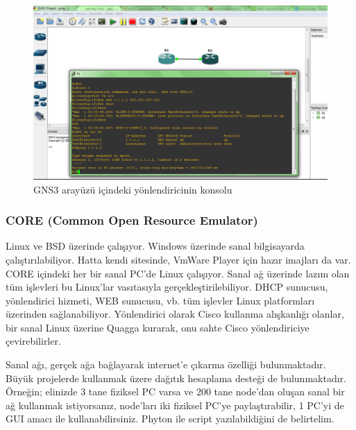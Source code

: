 \begin{figure}[H]
    \centering
    \includegraphics[width=\textwidth]{images/SimulatorGNS3.png}
    \caption{GNS3 arayüzü içindeki yönlendiricinin konsolu}
    \label{fig:GNS3}
\end{figure}

\subsubsection{CORE (Common Open Resource Emulator) }
Linux ve BSD üzerinde çalışıyor. Windows üzerinde sanal bilgisayarda çalıştırılabiliyor. Hatta kendi sitesinde, VmWare Player için hazır imajları da var. CORE içindeki her bir sanal PC'de Linux çalışıyor. Sanal ağ üzerinde lazım olan tüm işlevleri bu Linux'lar vasıtasıyla gerçekleştirilebiliyor. DHCP sunucusu, yönlendirici hizmeti, WEB sunucusu, vb. tüm işlevler Linux platformları üzerinden sağlanabiliyor. Yönlendirici olarak Cisco kullanma alışkanlığı olanlar, bir sanal Linux üzerine Quagga kurarak, onu sahte Cisco yönlendiriciye çevirebilirler.

Sanal ağı, gerçek ağa bağlayarak internet'e çıkarma özelliği bulunmaktadır. Büyük projelerde kullanmak üzere dağıtık hesaplama desteği de bulunmaktadır. Örneğin; elinizde 3 tane fiziksel PC varsa ve 200 tane node'dan oluşan sanal bir ağ kullanmak istiyorsanız, node'ları iki fiziksel PC'ye paylaştırabilir, 1 PC'yi de GUI amacı ile kullanabilirsiniz. Phyton ile script yazılabildiğini de belirtelim.

